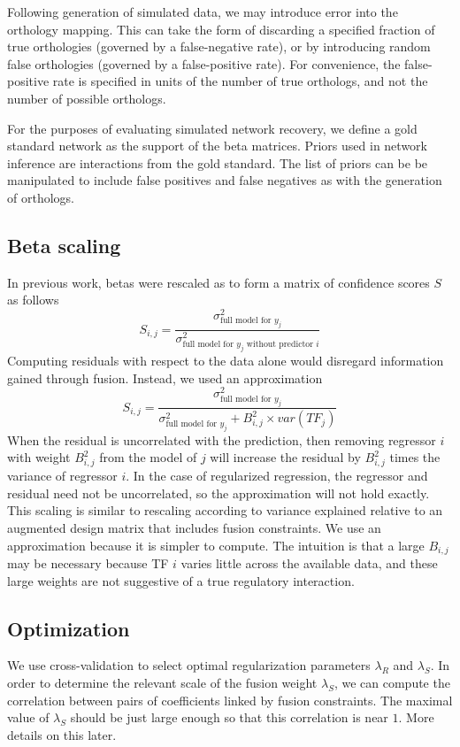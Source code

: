 \documentclass[11pt]{article}
\begin{document}
Following generation of simulated data, we may introduce error into the orthology mapping. This can take the form of discarding a specified fraction of true orthologies (governed by a false-negative rate), or by introducing random false orthologies (governed by a false-positive rate). For convenience, the false-positive rate is specified in units of the number of true orthologs, and not the number of possible orthologs. 

For the purposes of evaluating simulated network recovery, we define a gold standard network as the support of the beta matrices. Priors used in network inference are interactions from the gold standard. The list of priors can be be manipulated to include false positives and false negatives as with the generation of orthologs. 

\subsection{Beta scaling}
In previous work, betas were rescaled as to form a matrix of confidence scores $S$ as follows
\begin{equation}
S_{i,j} = \frac{\sigma^2_{\text{full model for }y_j}}{\sigma^2_{\text{full model for }y_j \text{ without predictor }i}}
\end{equation}
Computing residuals with respect to the data alone would disregard information gained through fusion. Instead, we used an approximation
\begin{equation}
S_{i,j} = \frac{\sigma^2_{\text{full model for }y_j}}{\sigma^2_{\text{full model for }y_j} + B_{i,j}^2 \times var(TF_j)}
\end{equation}
When the residual is uncorrelated with the prediction, then removing regressor $i$ with weight $B_{i,j}^2$ from the model of $j$ will increase the residual by $B_{i,j}^2$ times the variance of regressor $i$. In the case of regularized regression, the regressor and residual need not be uncorrelated, so the approximation will not hold exactly. This scaling is similar to rescaling according to variance explained relative to an augmented design matrix that includes fusion constraints. We use an approximation because it is simpler to compute. The intuition is that a large $B_{i,j}$ may be necessary because TF $i$ varies little across the available data, and these large weights are not suggestive of a true regulatory interaction.

\subsection{Optimization}
We use cross-validation to select optimal regularization parameters $\lambda_R$ and $\lambda_S$. In order to determine the relevant scale of the fusion weight $\lambda_S$, we can compute the correlation between pairs of coefficients linked by fusion constraints. The maximal value of $\lambda_S$ should be just large enough so that this correlation is near $1$. More details on this later.
\end{document}
